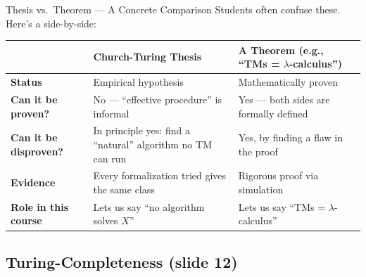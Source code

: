 \begin{examplebox}{Thesis vs.\ Theorem --- A Concrete Comparison}
Students often confuse these. Here's a side-by-side:

\begin{center}
\renewcommand{\arraystretch}{1.4}
\begin{tabular}{p{3.5cm}p{5.5cm}p{5.5cm}}
\toprule
& \textbf{Church-Turing Thesis} & \textbf{A Theorem (e.g., ``TMs = $\lambda$-calculus'')} \\
\midrule
\textbf{Status} & Empirical hypothesis & Mathematically proven \\
\textbf{Can it be proven?} & No --- ``effective procedure'' is informal & Yes --- both sides are formally defined \\
\textbf{Can it be disproven?} & In principle yes: find a ``natural'' algorithm no TM can run & Yes, by finding a flaw in the proof \\
\textbf{Evidence} & Every formalization tried gives the same class & Rigorous proof via simulation \\
\textbf{Role in this course} & Lets us say ``no algorithm solves $X$'' & Lets us say ``TMs = $\lambda$-calculus'' \\
\bottomrule
\end{tabular}
\end{center}

\end{examplebox}


\subsection{Turing-Completeness (slide 12)}


